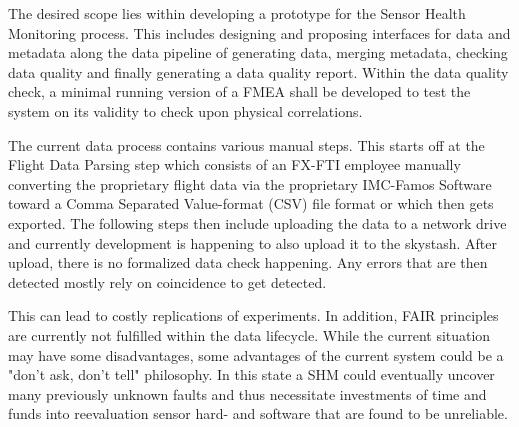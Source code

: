 The desired scope lies within developing a prototype for the Sensor Health Monitoring process. This includes designing and proposing interfaces for data and metadata along the data pipeline of generating data, merging metadata, checking data quality and finally generating a data quality report. Within the data quality check, a minimal running version of a FMEA shall be developed to test the system on its validity to check upon physical correlations.


The current data process contains various manual steps. This starts off at the Flight Data Parsing step which  consists of an FX-FTI employee manually converting the proprietary flight data via the proprietary IMC-Famos Software toward a Comma Separated Value-format (CSV) file format or  which then gets exported. The following steps then include uploading the data to a network drive and currently development is happening to also upload it to the skystash. After upload, there is no formalized data check happening. Any errors that are then detected mostly rely on coincidence to get detected.






This can lead to costly replications of experiments. In addition, FAIR principles are currently not fulfilled within the data lifecycle. While the current situation may have some disadvantages, some advantages of the current system could be a "don't ask, don't tell" philosophy. In this state a SHM could eventually uncover many previously unknown faults and thus necessitate investments of time and funds into reevaluation sensor hard- and software that are found to be unreliable.



